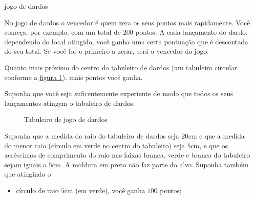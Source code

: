 \begin{task}{jogo de dardos}



No jogo de dardos o vencedor é quem zera os seus pontos mais rapidamente. Você começa, por exemplo, com um total de $200$ pontos. A cada lançamento do dardo, dependendo do local atingido, você ganha uma certa pontuação que é descontada do seu total. Se você for o primeiro a zerar, será o vencedor do jogo.

Quanto mais próximo do centro do tabuleiro de dardos (um tabuleiro circular conforme a \hyperref[dardos]{figura \ref{dardos}}), mais pontos você ganha.

Suponha que você seja suficentemente experiente de modo que todos os seus lançamentos atingem o tabuleiro de dardos.

\begin{figure}[H]
\centering


\caption{Tabuleiro de jogo de dardos}
\label{dardos}
\end{figure}

Suponha que a medida do raio do tabuleiro de dardos seja $20$cm e que a medida do menor raio (círculo em verde no centro do tabuleiro) seja $5$cm, e que os acréscimos de comprimento do raio nas faixas branca, verde e branca do tabuleiro sejam iguais a $5$cm. A moldura em preto não faz parte do alvo. Suponha também que atingindo o
\begin{itemize}
\item {} 
círculo de raio $5$cm (em verde), você ganha $100$ pontos;


\end{itemize}
\end{task}
